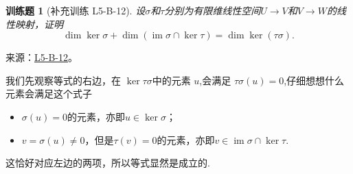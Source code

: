 \documentclass[12pt,fontset=fandol]{ctexart}
\newtheorem{exercise}{训练题}[section]
\begin{document}
\begin{exercise}[补充训练 L5-B-12]\label{prob:L5-B-12}
设$\sigma$和$\tau$分别为有限维线性空间$U\to V$和$V\to W$的线性映射，证明
        \[\dim\ker\sigma+\dim(\operatorname{im}\sigma\cap\ker\tau)=\dim\ker(\tau\sigma).\]
\end{exercise}
\noindent 来源：\href{https://github.com/yhwu-is/Linear-Algebra-Left-Undone/blob/new/%E8%AE%B2%E4%B9%89/%E4%B8%93%E9%A2%98/5%20%E7%BA%BF%E6%80%A7%E6%98%A0%E5%B0%84.tex}{L5-B-12}。
\begin{solve}
我们先观察等式的右边，在 $\ker \tau \sigma$中的元素 $u$,会满足 $\tau \sigma (u) = 0 $,仔细想想什么元素会满足这个式子
            \begin{itemize}
                \item $\sigma(u)=0$的元素，亦即$u\in \ker \sigma$；
                \item $v=\sigma(u)\neq 0$，但是$\tau(v)=0$的元素，亦即$v\in \operatorname{im} \sigma \cap \ker \tau$.
            \end{itemize}
            这恰好对应左边的两项，所以等式显然是成立的.
\end{solve}
\end{document}
